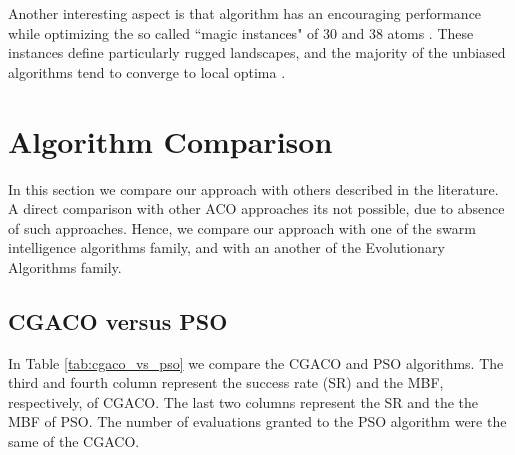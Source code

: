 	Another interesting aspect is that algorithm has an encouraging performance while optimizing the so called ``magic instances" of 30 and 38 atoms \cite{doye97}. These instances define particularly rugged landscapes, and the majority of the unbiased algorithms tend to converge to local optima \cite{doye97, grosso07}.
	
	\section{Algorithm Comparison}
	In this section we compare our approach with others described in the literature. A direct comparison with other ACO approaches its not possible, due to absence of such approaches. Hence, we compare our approach with one of the swarm intelligence algorithms family, and with an another of the Evolutionary Algorithms family.
	\subsection{CGACO versus PSO}
	In Table \ref{tab:cgaco_vs_pso} we compare the CGACO and PSO algorithms. The third and fourth column represent the success rate (SR) and the MBF, respectively, of CGACO. The last two columns represent the SR and the the MBF of PSO. The number of evaluations granted to the PSO algorithm were the same of the CGACO. 
	
